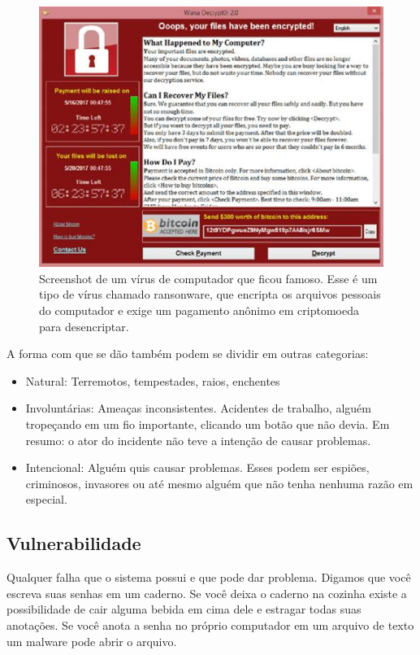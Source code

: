 \begin{figure}[htb]
    \centering
    \includegraphics[width=\textwidth]{img/wannacry.jpg}
    \caption{Screenshot de um vírus de computador que ficou famoso. Esse é um tipo de vírus chamado ransonware, que encripta os arquivos pessoais do computador e exige um pagamento anônimo em criptomoeda para desencriptar.}
    \label{fig:wannacry}
\end{figure}

A forma com que se dão também podem se dividir em outras categorias:

\begin{itemize}
    \item Natural: Terremotos, tempestades, raios, enchentes
    \item Involuntárias: Ameaças inconsistentes. Acidentes de trabalho, alguém tropeçando em um fio importante, clicando um botão que não devia. Em resumo: o ator do incidente não teve a intenção de causar problemas.
    \item Intencional: Alguém quis causar problemas. Esses podem ser espiões, criminosos, invasores ou até mesmo alguém que não tenha nenhuma razão em especial.
\end{itemize}

\subsection{Vulnerabilidade}

Qualquer falha que o sistema possui e que pode dar problema. Digamos que você escreva suas senhas em um caderno. Se você deixa o caderno na cozinha existe a possibilidade de cair alguma bebida em cima dele e estragar todas suas anotações. Se você anota a senha no próprio computador em um arquivo de texto um malware pode abrir o arquivo.

